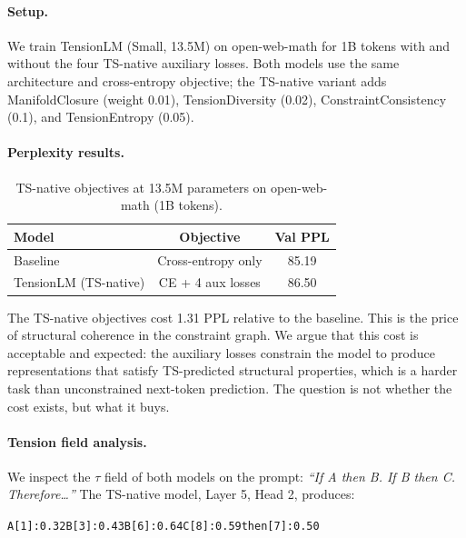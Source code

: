 \documentclass[10pt,a4paper]{article}
\begin{document}
\paragraph{Setup.} We train TensionLM (Small, 13.5M) on open-web-math \cite{paster2023openwebmath} for 1B tokens with and without the four TS-native auxiliary losses. Both models use the same architecture and cross-entropy objective; the TS-native variant adds ManifoldClosure (weight 0.01), TensionDiversity (0.02), ConstraintConsistency (0.1), and TensionEntropy (0.05).

\paragraph{Perplexity results.}

\begin{table}[h]
\centering
\caption{TS-native objectives at 13.5M parameters on open-web-math (1B tokens).}
\label{tab:exp2}
\vspace{4pt}
\begin{tabular}{lcc}
\toprule
Model & Objective & Val PPL \\
\midrule
Baseline & Cross-entropy only & 85.19 \\
TensionLM (TS-native) & CE + 4 aux losses & 86.50 \\
\bottomrule
\end{tabular}
\end{table}

The TS-native objectives cost 1.31 PPL relative to the baseline. This is the price of structural coherence in the constraint graph. We argue that this cost is acceptable and expected: the auxiliary losses constrain the model to produce representations that satisfy TS-predicted structural properties, which is a harder task than unconstrained next-token prediction. The question is not whether the cost exists, but what it buys.

\paragraph{Tension field analysis.} We inspect the $\tau$ field of both models on the prompt: \textit{``If A then B. If B then C. Therefore\ldots''} The TS-native model, Layer 5, Head 2, produces:

\begin{center}
\texttt{A[1]:0.32\quad B[3]:0.43\quad B[6]:0.64\quad C[8]:0.59\quad then[7]:0.50}
\end{center}
\end{document}
